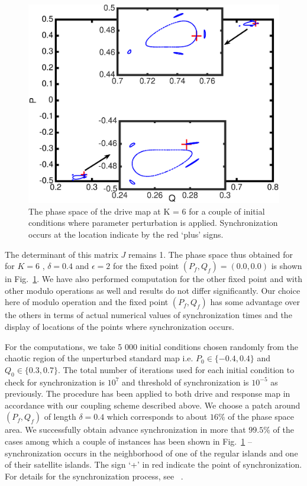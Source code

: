 \documentclass[reprint,superscriptaddress,amsmath,amssymb,aps,pre]{revtex4-1}
\begin{document}
\begin{figure}[t]
	\includegraphics[scale=0.4]{Fast_sync_location.eps}
	\caption{\label{fig:location}\footnotesize The phase space of the drive 
	map at K = 6 for a couple of initial conditions where parameter 
	perturbation is applied. Synchronization occurs at the location indicate 
	by the red `plus' signs.}
\end{figure}

The determinant of this matrix $J$ remains 1. The phase space thus obtained 
for for $K = 6$ , $\delta = 0.4$ and $\epsilon = 2$ for the fixed point 
$(P_f,Q_f)=(0.0,0.0)$ is shown in Fig.~\ref{fig:location}.   We have also 
performed computation for the other fixed point and with other modulo 
operations as well and results do not differ significantly. Our choice here of 
modulo operation and the fixed point $(P_f,Q_f)$ has some advantage over the 
others in terms of actual numerical values of synchronization times and the 
display of locations of the points where synchronization occurs. 

For the computations, we take 5 000 initial conditions chosen randomly from 
the chaotic region of the unperturbed standard map i.e. $P_0 \in \{-0.4,0.4\}$ 
and $Q_0 \in \{0.3,0.7\}$. The total number of iterations used for each 
initial condition to check for synchronization is $10^7$ and threshold of 
synchronization is $10^{-5}$ as previously.  The procedure has 
been applied to both drive and 
response map in accordance with our coupling  scheme described above. We 
choose a patch around $(P_f,Q_f)$  of length $\delta= 0.4$ which corresponds 
to about $16\%$ of the phase space area. We successfully obtain advance 
synchronization in more that $99.5\%$ of the cases among which a  couple of 
instances  has been shown in Fig.~\ref{fig:location} -- synchronization occurs 
in the neighborhood of one of the regular islands and one of their satellite 
islands.  The sign `+' in red indicate the point of synchronization. For 
details for the synchronization process, see ~\cite{Mahata2016,Das2017}.
\end{document}
